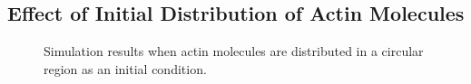 \documentclass[a4paper,12pt, oneside]{book}
\begin{document}
\subsection{Effect of Initial Distribution of Actin Molecules}

\begin{figure}[tbp]
 \caption{Simulation results when actin molecules are distributed in a circular region as an initial condition.}
 \label{fig:res4}
\end{figure}
\end{document}
